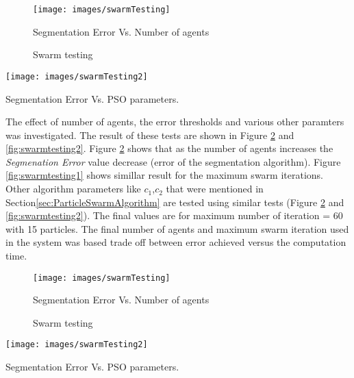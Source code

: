     
 \begin{figure}
	\centering		
	 \texttt{[image: images/swarmTesting]}
	 	\caption{Swarm testing} Segmentation Error Vs. Number of agents
	 	\label{fig:swarmtesting0}
\end{figure} 

\begin{figure*}
	\centering		
	 \texttt{[image: images/swarmTesting2]}
	 	\caption{Swarm testing} Segmentation Error Vs. PSO parameters.
	 	\label{fig:swarmtestingpso}
	 	\end{figure*} 
	 	
 The effect of number of agents, the error thresholds and various other paramters was investigated. The result of these tests are shown in Figure \ref{fig:swarmtesting} and  \ref{fig:swarmtesting2}. Figure \ref{fig:swarmtesting} shows that as the number of agents increases the \textit{Segmenation Error} value decrease (error of the segmentation algorithm). Figure \ref{fig:swarmtesting1} shows simillar result for the maximum swarm iterations. Other algorithm parameters like $c_1$,$c_2$ that were mentioned in Section\ref{sec:ParticleSwarmAlgorithm} are tested using similar tests (Figure \ref{fig:swarmtesting} and \ref{fig:swarmtesting2}). The final values are for maximum number of iteration = 60 with 15 particles. The final number of agents and maximum swarm iteration used in the system was based trade off between error achieved versus the computation time. 
    
 \begin{figure}
	\centering		
	 \texttt{[image: images/swarmTesting]}
	 	\caption{Swarm testing} Segmentation Error Vs. Number of agents
	 	\label{fig:swarmtesting}
\end{figure} 

\begin{figure*}
	\centering		
	 \texttt{[image: images/swarmTesting2]}
	 	\caption{Swarm testing} Segmentation Error Vs. PSO parameters.
	 	\label{fig:swarmtesting2}
	
\end{figure*} 


